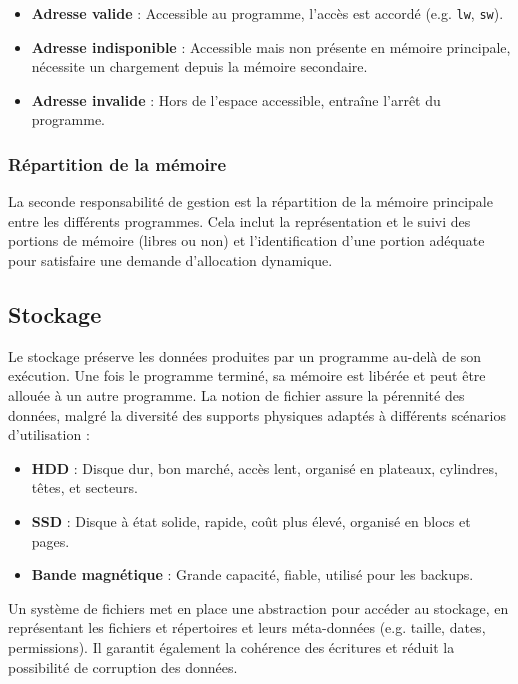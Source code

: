 \begin{itemize}
    \item \textbf{Adresse valide} : Accessible au programme, l'accès est accordé (e.g. \texttt{lw}, \texttt{sw}).
    \item \textbf{Adresse indisponible} : Accessible mais non présente en mémoire principale, nécessite un chargement depuis la mémoire secondaire.
    \item \textbf{Adresse invalide} : Hors de l'espace accessible, entraîne l'arrêt du programme.
\end{itemize}



\subsubsection{Répartition de la mémoire}

La seconde responsabilité de gestion est la répartition de la mémoire principale entre les différents programmes. Cela inclut la représentation et le suivi des portions de mémoire (libres ou non) et l'identification d'une portion adéquate pour satisfaire une demande d'allocation dynamique.

\subsection{Stockage}

Le stockage préserve les données produites par un programme au-delà de son exécution. Une fois le programme terminé, sa mémoire est libérée et peut être allouée à un autre programme. La notion de fichier assure la pérennité des données, malgré la diversité des supports physiques adaptés à différents scénarios d’utilisation :

\begin{itemize}
    \item \textbf{HDD} : Disque dur, bon marché, accès lent, organisé en plateaux, cylindres, têtes, et secteurs.
    \item \textbf{SSD} : Disque à état solide, rapide, coût plus élevé, organisé en blocs et pages.
    \item \textbf{Bande magnétique} : Grande capacité, fiable, utilisé pour les backups.
\end{itemize}

Un système de fichiers met en place une abstraction pour accéder au stockage, en représentant les fichiers et répertoires et leurs méta-données (e.g. taille, dates, permissions). Il garantit également la cohérence des écritures et réduit la possibilité de corruption des données.

